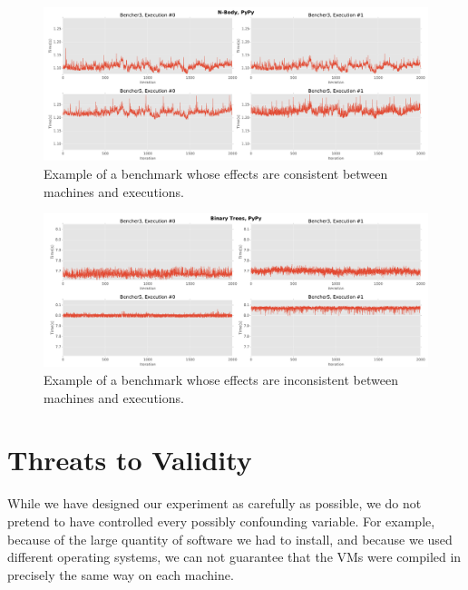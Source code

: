 \documentclass[10pt,preprint]{sigplanconf}
\begin{document}
\begin{figure}[h!]
\centering
\includegraphics[width=\textwidth]{examples/consistent_weirdness1}
\caption{Example of a benchmark whose effects are consistent between machines and executions.}
\label{fig:examples:consistent_weirdness1}
\end{figure}

\begin{figure}[h!]
\centering
\includegraphics[width=\textwidth]{examples/inconsistent_weirdness1}
\caption{Example of a benchmark whose effects are inconsistent between machines and executions.}
\label{fig:examples:inconsistent_weirdness1}
\end{figure}


\section{Threats to Validity}
\label{sec:threats}


While we have designed our experiment as carefully as possible, we do not
pretend to have controlled every possibly confounding variable. For example,
because of the large quantity of software we had to install, and because we used
different operating systems, we can not guarantee that the VMs were compiled in
precisely the same way on each machine. 
\end{document}
